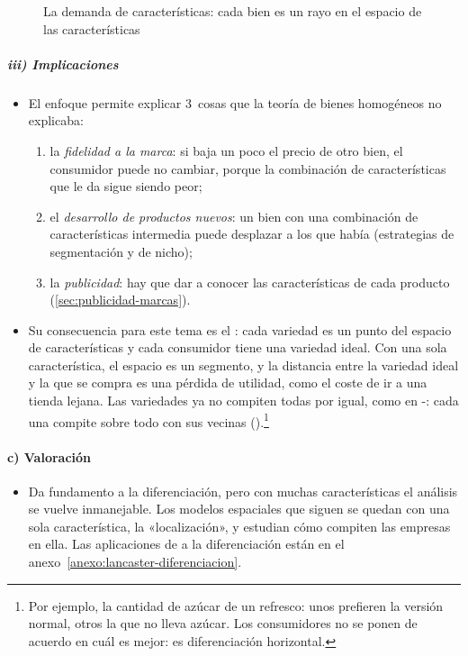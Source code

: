 \documentclass[11pt]{article}
\begin{document}
\begin{figure}[H]
\centering
\caption{La demanda de características: cada bien es un rayo en el espacio de las características}\label{fig:lancaster-diferenciacion}
\end{figure}

\subparagraph{iii) Implicaciones}

\begin{itemize}
\item El enfoque permite explicar 3~cosas que la teoría de bienes homogéneos no explicaba:
  \begin{enumerate}
  \item la \emph{fidelidad a la marca}: si baja un poco el precio de otro bien, el consumidor puede no cambiar, porque la combinación de características que le da sigue siendo peor;
  \item el \emph{desarrollo de productos nuevos}: un bien con una combinación de características intermedia puede desplazar a los que había (estrategias de segmentación y de nicho);
  \item la \emph{publicidad}: hay que dar a conocer las características de cada producto (\ref{sec:publicidad-marcas}).
  \end{enumerate}
\item Su consecuencia para este tema es el : cada variedad es un punto del espacio de características y cada consumidor tiene una variedad ideal. Con una sola característica, el espacio es un segmento, y la distancia entre la variedad ideal y la que se compra es una pérdida de utilidad, como el coste de ir a una tienda lejana. Las variedades ya no compiten todas por igual, como en -: cada una compite sobre todo con sus vecinas ().\footnote{Por ejemplo, la cantidad de azúcar de un refresco: unos prefieren la versión normal, otros la que no lleva azúcar. Los consumidores no se ponen de acuerdo en cuál es mejor: es diferenciación horizontal.}
\end{itemize}

\paragraph{c) Valoración}

\begin{itemize}
\item Da fundamento a la diferenciación, pero con muchas características el análisis se vuelve inmanejable. Los modelos espaciales que siguen se quedan con una sola característica, la «localización», y estudian cómo compiten las empresas en ella. Las aplicaciones de  a la diferenciación están en el anexo~\ref{anexo:lancaster-diferenciacion}.
\end{itemize}
\end{document}
